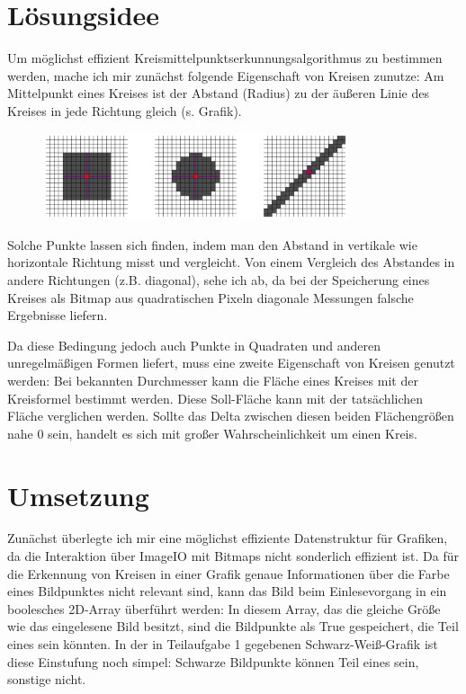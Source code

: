 \section{Lösungsidee}
Um möglichst effizient Kreismittelpunktserkunnungsalgorithmus zu bestimmen werden, mache ich mir zunächst folgende Eigenschaft von Kreisen zunutze: Am Mittelpunkt eines Kreises ist der Abstand (Radius) zu der äußeren Linie des Kreises in jede Richtung gleich (s. Grafik).

\begin{figure}[!ht]
	\centering	
	\includegraphics[width=0.8\textwidth]{durchmesservergleich}
	\label{Verschiedene Formen mit eingezeichnetem Mittelpunkt nach erstem Kriterium}
\end{figure}

Solche Punkte lassen sich finden, indem man den Abstand in vertikale wie horizontale Richtung misst und vergleicht. Von einem Vergleich des Abstandes in andere Richtungen (z.B. diagonal), sehe ich ab, da bei der Speicherung eines Kreises als Bitmap aus quadratischen Pixeln diagonale Messungen falsche Ergebnisse liefern.

Da diese Bedingung jedoch auch Punkte in Quadraten und anderen unregelmäßigen Formen liefert, muss eine zweite Eigenschaft von Kreisen genutzt werden: Bei bekannten Durchmesser kann die Fläche eines Kreises mit der Kreisformel bestimmt werden. Diese Soll-Fläche kann mit der tatsächlichen Fläche verglichen werden. Sollte das Delta zwischen diesen beiden Flächengrößen nahe 0 sein, handelt es sich mit großer Wahrscheinlichkeit um einen Kreis. 
\section{Umsetzung}
Zunächst überlegte ich mir eine möglichst effiziente Datenstruktur für Grafiken, da die Interaktion über ImageIO mit Bitmaps nicht sonderlich effizient ist. Da für die Erkennung von Kreisen in einer Grafik genaue Informationen über die Farbe eines Bildpunktes nicht relevant sind, kann das Bild beim Einlesevorgang in ein boolesches 2D-Array überführt werden: In diesem Array, das die gleiche Größe wie das eingelesene Bild besitzt, sind die Bildpunkte als True gespeichert, die Teil eines \task sein könnten. In der in Teilaufgabe 1 gegebenen Schwarz-Weiß-Grafik ist diese Einstufung noch simpel: Schwarze Bildpunkte können Teil eines \task sein, sonstige nicht.


